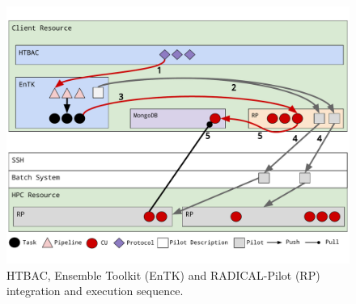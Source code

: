   
\begin{figure}
  \centering
  \includegraphics[width=\columnwidth]{figures/ht-bac-rp_integration.pdf}
  \caption{HTBAC, Ensemble Toolkit (EnTK) and RADICAL-Pilot (RP) integration 
  and execution sequence.}
\label{fig:integration}
\end{figure}







